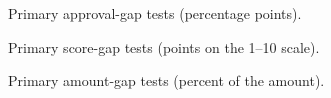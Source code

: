 \documentclass[conference]{IEEEtran}
\begin{document}
\begin{table}[t]
\caption{Primary approval-gap tests (percentage points).}
\label{tab:A1}
\centering
\footnotesize

\end{table}

\begin{table}[t]
\caption{Primary score-gap tests (points on the 1--10 scale).}
\label{tab:A2}
\centering
\footnotesize

\end{table}

\begin{table}[t]
\caption{Primary amount-gap tests (percent of the amount).}
\label{tab:A3}
\centering
\footnotesize

\end{table}



\end{document}
